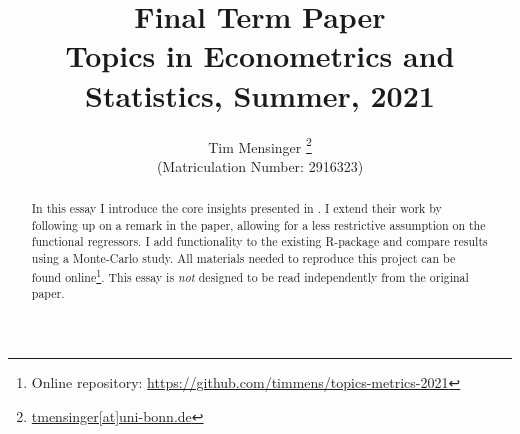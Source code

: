 \documentclass[a4paper, 12pt]{article}
\title{\textbf{Final Term Paper}\\
    \Large Topics in Econometrics and Statistics, Summer, 2021
}
\date{}
\author{Tim Mensinger%
  \thanks{\href{mailto:tmensinger@uni-bonn.de}{tmensinger[at]uni-bonn.de}}\\[-0.5em]
  {\small(Matriculation Number: 2916323)}
}
\affil{University of Bonn}
\begin{document}
\onehalfspacing


\maketitle
\begin{abstract}
    In this essay I introduce the core insights presented in \cite{Kneip2020}. I extend
    their work by following up on a remark in the paper, allowing for a less restrictive
    assumption on the functional regressors. I add functionality to the existing
    \textsf{R}-package and compare results using a Monte-Carlo study. All materials
    needed to reproduce this project can be found online\footnote{Online repository:
    \url{https://github.com/timmens/topics-metrics-2021}}. This essay is \emph{not}
    designed to be read independently from the original paper.
\end{abstract}
\thispagestyle{empty}

\newpage






\printbibliography
\end{document}
